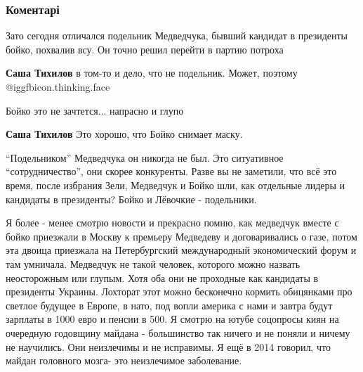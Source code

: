  
 
 
 
 
\subsubsection{Коментарі}

\begin{itemize} %

Зато сегодня отличался подельник Медведчука, бывший кандидат в президенты
бойко, похвалив всу. Он точно решил перейти в партию потроха

\begin{itemize} %
\textbf{Саша Тихилов} в том-то и дело, что не подельник. Может, поэтому  @igg{fbicon.thinking.face} 

Бойко это не зачтется... напрасно и глупо

\textbf{Саша Тихилов}
Это хорошо, что Бойко снимает маску.

\enquote{Подельником} Медведчука он никогда не был. Это ситуативное \enquote{сотрудничество},
они скорее конкуренты. Разве вы не заметили, что всё это время, после избрания
Зели, Медведчук и Бойко шли, как отдельные лидеры и кандидаты в президенты?
Бойко и Лёвочкие - подельники.



Я более - менее смотрю новости и прекрасно помню, как медведчук вместе с бойко
приезжали в Москву к премьеру Медведеву и договаривались о газе, потом эта
двоица приезжала на Петербургский международный экономический форум и там
умничала. Медведчук не такой человек, которого можно назвать неосторожным или
глупым. Хотя оба они не проходные как кандидаты в президенты Украины. Лохторат
этот можно бесконечно кормить обицянками про светлое будущее в Европе, в нато,
под вопли америка с нами и завтра будут зарплаты в 1000 евро и пенсии в 500. Я
смотрю на ютубе соцопросы киян на очередную годовщину майдана - большинство так
ничего и не поняли и ничему не научились. Они неизлечимы и не исправимы. Я ещё
в 2014 говорил, что майдан головного мозга- это неизлечимое заболевание.
\end{itemize} %


\end{itemize}
